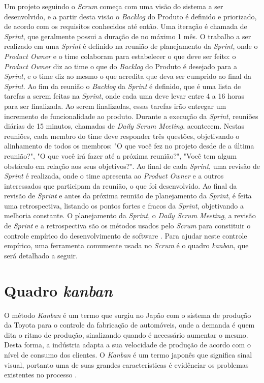 Um projeto seguindo o \textit{Scrum} começa com uma visão do sistema a ser desenvolvido, e a partir desta visão o \textit{Backlog} do Produto é definido e priorizado, de acordo com os requisitos conhecidos até então. Uma iteração é chamada de \textit{Sprint}, que geralmente possui a duração de no máximo 1 mês. O trabalho a ser realizado em uma \textit{Sprint} é definido na reunião de planejamento da \textit{Sprint}, onde o \textit{Product Owner} e o time colaboram para estabelecer o que deve ser feito: o \textit{Product Owner} diz ao time o que do \textit{Backlog} do Produto é desejado para a \textit{Sprint}, e o time diz ao mesmo o que acredita que deva ser cumprido ao final da \textit{Sprint}. Ao fim da reunião o \textit{Backlog} da \textit{Sprint} é definido, que é uma lista de tarefas a serem feitas na \textit{Sprint}, onde cada uma deve levar entre 4 a 16 horas para ser finalizada. Ao serem finalizadas, essas tarefas irão entregar um incremento de funcionalidade ao produto. Durante a execução da \textit{Sprint}, reuniões diárias de 15 minutos, chamadas de \textit{Daily Scrum Meeting}, acontecem. Nestas reuniões, cada membro do time deve responder três questões, objetivando o alinhamento de todos os membros: "O que você fez no projeto desde de a última reunião?", "O que você irá fazer até a próxima reunião?", "Você tem algum obstáculo em relação aos seus objetivos?". Ao final de cada \textit{Sprint}, uma revisão de \textit{Sprint} é realizada, onde o time apresenta ao \textit{Product Owner} e a outros interessados que participam da reunião, o que foi desenvolvido. Ao final da revisão de \textit{Sprint} e antes da próxima reunião de planejamento da \textit{Sprint}, é feita uma retrospectiva, listando os pontos fortes e fracos da \textit{Sprint}, objetivando a melhoria constante. O planejamento da \textit{Sprint}, o \textit{Daily Scrum Meeting}, a revisão de \textit{Sprint} e a retrospectiva são os métodos usados pelo \textit{Scrum} para constituir o controle empírico do desenvolvimento de software \cite{scrum2005}. Para ajudar neste controle empírico, uma ferramenta comumente usada no \textit{Scrum} é o quadro \textit{kanban}, que será detalhado a seguir.

\section{Quadro \textit{kanban}}

O método \textit{Kanban} é um termo que surgiu no Japão com o sistema de produção da Toyota para o controle da fabricação de automóveis, onde a demanda é quem dita o ritmo de produção, sinalizando quando é necessário aumentar o mesmo. Desta forma, a indústria adapta a sua velocidade de produção de acordo com o nível de consumo dos clientes. O \textit{Kanban} é um termo japonês que significa sinal visual, portanto uma de suas grandes características é evidênciar os problemas existentes no processo \cite{silva2010kanban}.

